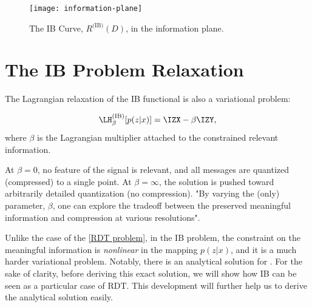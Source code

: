 \begin{figure}
	[htb] \centering
	\texttt{[image: information-plane]}
	\caption{The IB Curve, $R^{\text{(IB)}}(D)$, in the information plane.}\label{fig:information-plane}
\end{figure}
\section{The IB Problem Relaxation}\label{sec:ib_problem_relaxation}
The Lagrangian relaxation of the IB functional is also a variational problem:

\begin{align}
	\LH_{\beta}^{\text{(IB)}}[p(z|x)] = \IZX - \beta \IZY, \label{IB_Lagrangian}
\end{align}
where $\beta$ is the Lagrangian multiplier attached to the constrained relevant information\cite{tishby:1999}.

At $\beta=0$, no feature of the signal is relevant, and all messages are quantized (compressed) to a single point. At $\beta=\infty$, the solution is pushed toward arbitrarily detailed quantization (no compression). "By varying the (only) parameter, $ \beta$, one can explore the tradeoff between the preserved meaningful information and compression at various resolutions"\cite{tishby:1999}.


Unlike the case of the \cref{RDT problem}, in the IB problem, the constraint on the meaningful information is \emph{nonlinear} in the mapping  $p(z|x)$, and it is a much harder variational problem. Notably, there is an analytical solution for . For the sake of clarity, before deriving this exact solution, we will show how IB can be seen as a particular case of \ac*{RDT}. This development will further help us to derive the analytical solution easily.


